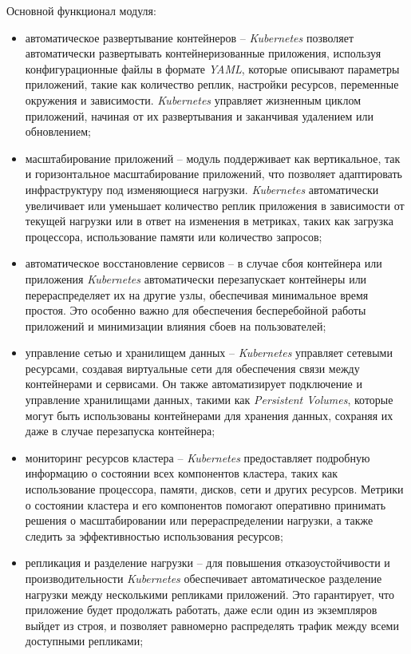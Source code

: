 Основной функционал модуля:

\begin{itemize}
    \item автоматическое развертывание контейнеров -- \textit{Kubernetes} позволяет автоматически развертывать контейнеризованные приложения, используя конфигурационные файлы в формате \textit{YAML}, которые описывают параметры приложений, такие как количество реплик, настройки ресурсов, переменные окружения и зависимости. \textit{Kubernetes} управляет жизненным циклом приложений, начиная от их развертывания и заканчивая удалением или обновлением; 
    \item масштабирование приложений -- модуль поддерживает как вертикальное, так и горизонтальное масштабирование приложений, что позволяет адаптировать инфраструктуру под изменяющиеся нагрузки. \textit{Kubernetes} автоматически увеличивает или уменьшает количество реплик приложения в зависимости от текущей нагрузки или в ответ на изменения в метриках, таких как загрузка процессора, использование памяти или количество запросов;
    \item автоматическое восстановление сервисов -- в случае сбоя контейнера или приложения \textit{Kubernetes} автоматически перезапускает контейнеры или перераспределяет их на другие узлы, обеспечивая минимальное время простоя. Это особенно важно для обеспечения бесперебойной работы приложений и минимизации влияния сбоев на пользователей; 
    \item управление сетью и хранилищем данных -- \textit{Kubernetes} управляет сетевыми ресурсами, создавая виртуальные сети для обеспечения связи между контейнерами и сервисами. Он также автоматизирует подключение и управление хранилищами данных, такими как \textit{Persistent Volumes}, которые могут быть использованы контейнерами для хранения данных, сохраняя их даже в случае перезапуска контейнера;
    \item мониторинг ресурсов кластера -- \textit{Kubernetes} предоставляет подробную информацию о состоянии всех компонентов кластера, таких как использование процессора, памяти, дисков, сети и других ресурсов. Метрики о состоянии кластера и его компонентов помогают оперативно принимать решения о масштабировании или перераспределении нагрузки, а также следить за эффективностью использования ресурсов; 
    \item репликация и разделение нагрузки -- для повышения отказоустойчивости и производительности \textit{Kubernetes} обеспечивает автоматическое разделение нагрузки между несколькими репликами приложений. Это гарантирует, что приложение будет продолжать работать, даже если один из экземпляров выйдет из строя, и позволяет равномерно распределять трафик между всеми доступными репликами;

\end{itemize}
